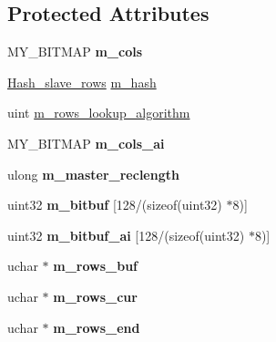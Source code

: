 \subsection*{Protected Attributes}
\begin{DoxyCompactItemize}
\item 
\mbox{\label{classRows__log__event_afdc4bc6754c8faeeceb3e341c7bddc4c}} 
M\+Y\+\_\+\+B\+I\+T\+M\+AP {\bfseries m\+\_\+cols}
\item 
\mbox{\hyperlink{classHash__slave__rows}{Hash\+\_\+slave\+\_\+rows}} \mbox{\hyperlink{classRows__log__event_a4e650c9f7bb9f4a75b63340cc2eb3a60}{m\+\_\+hash}}
\item 
uint \mbox{\hyperlink{classRows__log__event_a34154d5894f717b32ccff5803a14f62e}{m\+\_\+rows\+\_\+lookup\+\_\+algorithm}}
\item 
\mbox{\label{classRows__log__event_ae80d0c7b763593c7d34c8e9c16734f9b}} 
M\+Y\+\_\+\+B\+I\+T\+M\+AP {\bfseries m\+\_\+cols\+\_\+ai}
\item 
\mbox{\label{classRows__log__event_a6efdb323188063f6de017241743aaf99}} 
ulong {\bfseries m\+\_\+master\+\_\+reclength}
\item 
\mbox{\label{classRows__log__event_a031c127c384f1e531c9f6fdf90866f72}} 
uint32 {\bfseries m\+\_\+bitbuf} \mbox{[}128/(sizeof(uint32) $\ast$8)\mbox{]}
\item 
\mbox{\label{classRows__log__event_afd30448222df2e8e2ed6a2fe2b43aa5d}} 
uint32 {\bfseries m\+\_\+bitbuf\+\_\+ai} \mbox{[}128/(sizeof(uint32) $\ast$8)\mbox{]}
\item 
\mbox{\label{classRows__log__event_a25866943b754ef5de12980f571342785}} 
uchar $\ast$ {\bfseries m\+\_\+rows\+\_\+buf}
\item 
\mbox{\label{classRows__log__event_a8cd5590ec0f6df0f2b0f152a9ee909f3}} 
uchar $\ast$ {\bfseries m\+\_\+rows\+\_\+cur}
\item 
\mbox{\label{classRows__log__event_a0da0072463be1fd9bbe17cdbf6e6200a}} 
uchar $\ast$ {\bfseries m\+\_\+rows\+\_\+end}
\end{DoxyCompactItemize}
